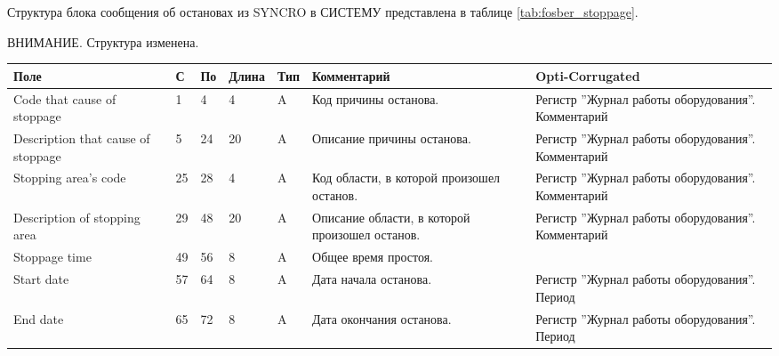\scriptsize
\begin{landscape}
Структура блока сообщения об остановах из SYNCRO в СИСТЕМУ представлена в таблице \ref{tab:fosber_stoppage}.

ВНИМАНИЕ. Структура изменена.

\scriptsize

\begin{longtable}{|p{45mm}|p{6mm}|p{6mm}|p{8mm}|p{6mm}|p{70mm}|p{80mm}|}
\hline
\parbox[c][10mm]{45mm}{\centering Поле} & \parbox{6mm}{\centering С} & \parbox{6mm}{\centering По} & \parbox{8mm}{\centering Длина} & \parbox{5mm}{\centering Тип} & \parbox{70mm}{\centering Комментарий}  & \parbox{80mm}{\centering Opti-Corrugated} \\

\hline
\parbox[c][10mm]{45mm}{Code that cause of stoppage } & \parbox{9mm}{1} & \parbox{9mm}{4} & \parbox{11mm}{4} & \parbox{10mm}{A} & \parbox{70mm}{Код причины останова.} & \parbox{80mm}{Регистр ''Журнал работы оборудования''. Комментарий} \\
\hline
\parbox[c][10mm]{45mm}{Description that cause of stoppage} & \parbox{9mm}{5} & \parbox{9mm}{24} & \parbox{11mm}{20} & \parbox{10mm}{A} & \parbox{70mm}{Описание причины останова.} & \parbox{80mm}{Регистр ''Журнал работы оборудования''. Комментарий} \\
\hline
\parbox[c][10mm]{45mm}{Stopping area’s code} & \parbox{9mm}{25} & \parbox{9mm}{28} & \parbox{11mm}{4} & \parbox{10mm}{A} & \parbox{70mm}{Код области, в которой произошел останов.} & \parbox{80mm}{Регистр ''Журнал работы оборудования''. Комментарий} \\
\hline
\parbox[c][10mm]{45mm}{Description of stopping area} & \parbox{9mm}{29} & \parbox{9mm}{48} & \parbox{11mm}{20} & \parbox{10mm}{A} & \parbox{70mm}{Описание области, в которой произошел останов.} & \parbox{80mm}{Регистр ''Журнал работы оборудования''. Комментарий} \\
\hline
\parbox[c][10mm]{45mm}{Stoppage time} & \parbox{9mm}{49} & \parbox{9mm}{56} & \parbox{11mm}{8} & \parbox{10mm}{A} & \parbox{70mm}{Общее время простоя.} & \parbox{80mm}{} \\
\hline
\parbox[c][10mm]{45mm}{Start date } & \parbox{9mm}{57} & \parbox{9mm}{64} & \parbox{11mm}{8} & \parbox{10mm}{A} & \parbox{70mm}{Дата начала останова.} & \parbox{80mm}{Регистр ''Журнал работы оборудования''. Период} \\
\hline
\parbox[c][10mm]{45mm}{End date} & \parbox{9mm}{65} & \parbox{9mm}{72} & \parbox{11mm}{8} & \parbox{10mm}{A} & \parbox{70mm}{Дата окончания останова.} & \parbox{80mm}{Регистр ''Журнал работы оборудования''. Период} \\

\end{longtable}
\end{landscape}
